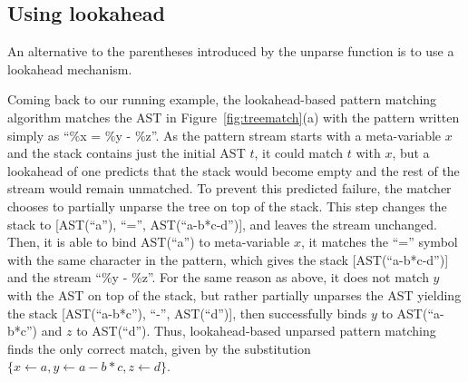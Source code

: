 \documentclass{sigplanconf}
\begin{document}


\subsection{Using lookahead}
An alternative to the parentheses introduced by the unparse function
is to use a lookahead mechanism.

Coming back to our running example, the lookahead-based pattern
matching algorithm matches the AST in Figure~\ref{fig:treematch}(a)
with the pattern written simply as ``\%x = \%y - \%z''.  As the
pattern stream starts with a meta-variable $x$ and the stack contains
just the initial AST $t$, it could match $t$ with $x$, but a lookahead
of one predicts that the stack would become empty and the rest of the
stream would remain unmatched. To prevent this predicted failure, the
matcher chooses to partially unparse the tree on top of the
stack. This step changes the stack to [AST(``a''), ``='',
AST(``a-b*c-d'')], and leaves the stream unchanged. Then, it is able
to bind AST(``a'') to meta-variable $x$, it matches the ``='' symbol
with the same character in the pattern, which gives the stack
[AST(``a-b*c-d'')] and the stream ``\%y - \%z''. For the same reason
as above, it does not match $y$ with the AST on top of the stack, but
rather partially unparses the AST yielding the stack [AST(``a-b*c''),
``-'', AST(``d'')], then successfully binds $y$ to AST(``a-b*c'') and
$z$ to AST(``d''). Thus, lookahead-based unparsed pattern matching
finds the only correct match, given by the substitution $\{x\gets a,
y\gets a-b*c, z\gets d\}$.
\end{document}
